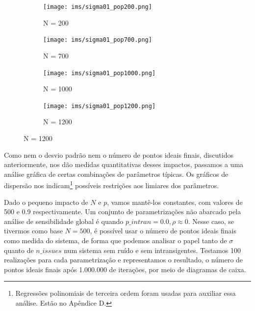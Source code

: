   \begin{figure}[H]
    \centering
     \caption{ Intransigentes com \(\sigma = 0.01\). Parametrização global: \( \sigma =
       0.1, \text{ } p\_intran = 0.15, \text{ } p = 0.9,
       \text{ } \rho = 1e-5, \text{ } n\_issues = 1 \)}
    \begin{subfigure}[b]{0.49\textwidth}
      \texttt{[image: ims/sigma01\_pop200.png]}
      \caption{N = 200}
    \end{subfigure}
    \begin{subfigure}[b]{0.49\textwidth}
      \texttt{[image: ims/sigma01\_pop700.png]}
       \caption{N = 700}
     \end{subfigure}

         \begin{subfigure}[b]{0.49\textwidth}
      \texttt{[image: ims/sigma01\_pop1000.png]}
       \caption{N = 1000}
     \end{subfigure}
         \begin{subfigure}[b]{0.49\textwidth}
      \texttt{[image: ims/sigma01\_pop1200.png]}
       \caption{N = 1200}
     \end{subfigure}

    \label{fig:newintrans2}
     \end{figure}
  

  
     Como nem o desvio padrão nem o número de pontos ideais finais, discutidos
     anteriormente, nos dão medidas quantitativas desses impactos, passamos a
     uma análise gráfica de certas combinações de parâmetros típicas. Os
     gráficos de dispersão nos indicam\footnote{Regressões polinomiais de
       terceira ordem foram usadas para auxiliar essa análise. Estão no Apêndice
       D.} possíveis restrições aos limiares dos parâmetros.

    Dado o pequeno impacto de \(N\) e \(p\), vamos mantê-los constantes, com
    valores de 500 e 0.9 respectivamente. Um conjunto de parametrizações não
    abarcado pela análise de sensibilidade global é quando \(p\_intran = 0.0, \rho \approx
    0 \). Nesse caso, se tivermos como base \(N = 500\), é possível usar o
    número de pontos ideais finais como medida do sistema, de forma que podemos
    analisar o papel tanto de \(\sigma\) quanto de \(n\_issues\) num sistema sem
    ruído e sem intransigentes. Testamos 100 realizações para cada
    parametrização e representamos o resultado, o número de pontos ideais finais
    após 1.000.000 de iterações, por meio de diagramas de caixa.
    

